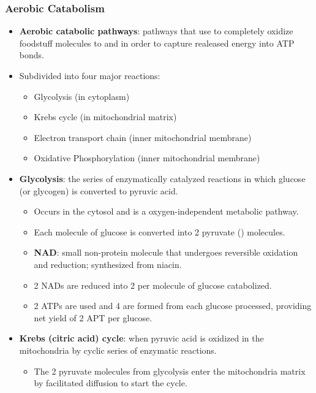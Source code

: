 \documentclass[12pt,a4paper]{article}
\begin{document}
\begin{itemize}
    \subsubsection{Aerobic Catabolism}
    \begin{itemize}
        \item \textbf{Aerobic catabolic pathways}: pathways that use  to completely oxidize foodstuff molecules to  and  in order to capture realeased energy into ATP bonds.
        \item Subdivided into four major reactions:
            \begin{itemize}
                \item Glycolysis (in cytoplasm)
                \item Krebs cycle (in mitochondrial matrix)
                \item Electron transport chain (inner mitochondrial membrane)
                \item Oxidative Phosphorylation (inner mitochondrial membrane)
            \end{itemize}
        \item \textbf{Glycolysis}: the series of enzymatically catalyzed reactions in which glucose (or glycogen) is converted to pyruvic acid.
            \begin{itemize}
                \item Occurs in the cytosol and is a oxygen-independent metabolic pathway.
                \item Each molecule of {\color{o-Sun}glucose} is converted into {\color{o-Sun}2 pyruvate ()} molecules.
                \item \textbf{NAD}: small non-protein molecule that undergoes reversible oxidation and reduction; synthesized from niacin.
                \item 2 NADs are reduced into {\color{o-Sun}2 } per molecule of glucose catabolized.
                \item 2 ATPs are used and 4 are formed from each glucose processed, providing {\color{o-Sun}net yield of 2 APT per glucose}.
            \end{itemize}
        \item \textbf{Krebs (citric acid) cycle}: when pyruvic acid is oxidized in the mitochondria by cyclic series of enzymatic reactions.
            \begin{itemize}
                \item The {\color{o-Sun}2 pyruvate} molecules from glycolysis enter the mitochondria matrix by facilitated diffusion to {\color{o-Sun}start the cycle}.

\end{itemize}
\end{itemize}
\end{itemize}
\end{document}
